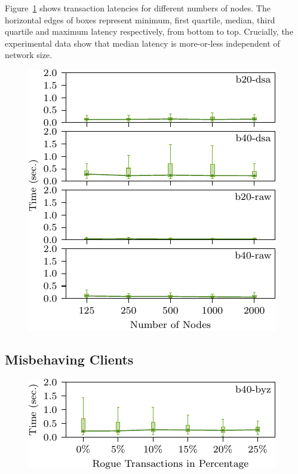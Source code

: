 Figure~\ref{fig:eval-lat2} shows
transaction latencies for different numbers of nodes.
The horizontal edges of boxes represent minimum,
first quartile, median, third quartile and maximum latency respectively, from
bottom to top.  Crucially, the experimental data show that median latency is more-or-less
independent of network size.

\begin{figure}[h]
\includegraphics[width=\linewidth]{figures/lat2.pdf}
\label{fig:eval-lat2}
\end{figure}

\subsection{Misbehaving Clients}%
\label{sec:evaluation-misbehaving}
\begin{figure}
\includegraphics[width=\linewidth]{figures/lat3.pdf}
\label{fig:eval-lat3}
\end{figure}

